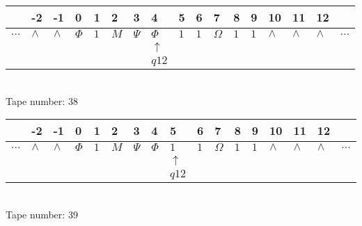 \documentclass{article}
\begin{document}
\begin{table}[H]
\centering
\begin{tabular}{lllllllllllllllll}
 & -2 & -1 & 0 & 1 & 2 & 3 & 4 & 5 & 6 & 7 & 8 & 9 & 10 & 11 & 12 & \\
\hline
$...$ & \multicolumn{1}{|l|}{$\wedge$} & \multicolumn{1}{|l|}{$\wedge$} & \multicolumn{1}{|l|}{$\Phi$} & \multicolumn{1}{|l|}{$1$} & \multicolumn{1}{|l|}{$M$} & \multicolumn{1}{|l|}{$\Psi$} & \multicolumn{1}{|l|}{$\Phi$} & \multicolumn{1}{|l|}{$1$} & \multicolumn{1}{|l|}{$1$} & \multicolumn{1}{|l|}{$\Omega$} & \multicolumn{1}{|l|}{$1$} & \multicolumn{1}{|l|}{$1$} & \multicolumn{1}{|l|}{$\wedge$} & \multicolumn{1}{|l|}{$\wedge$} & \multicolumn{1}{|l|}{$\wedge$} & $...$\\
\hline
&  &  &  &  &  &  & $\uparrow$ &  &  &  &  &  &  &  &  &  \\
&  &  &  &  &  &  & $ q12 $ &  &  &  &  &  &  &  &  &  \\
\end{tabular}
\\
Tape number: 38
\noindent\makebox[\linewidth]{\hdashrule{\textwidth}{1pt}{1pt}}\end{table}

\begin{table}[H]
\centering
\begin{tabular}{lllllllllllllllll}
 & -2 & -1 & 0 & 1 & 2 & 3 & 4 & 5 & 6 & 7 & 8 & 9 & 10 & 11 & 12 & \\
\hline
$...$ & \multicolumn{1}{|l|}{$\wedge$} & \multicolumn{1}{|l|}{$\wedge$} & \multicolumn{1}{|l|}{$\Phi$} & \multicolumn{1}{|l|}{$1$} & \multicolumn{1}{|l|}{$M$} & \multicolumn{1}{|l|}{$\Psi$} & \multicolumn{1}{|l|}{$\Phi$} & \multicolumn{1}{|l|}{$1$} & \multicolumn{1}{|l|}{$1$} & \multicolumn{1}{|l|}{$\Omega$} & \multicolumn{1}{|l|}{$1$} & \multicolumn{1}{|l|}{$1$} & \multicolumn{1}{|l|}{$\wedge$} & \multicolumn{1}{|l|}{$\wedge$} & \multicolumn{1}{|l|}{$\wedge$} & $...$\\
\hline
&  &  &  &  &  &  &  & $\uparrow$ &  &  &  &  &  &  &  &  \\
&  &  &  &  &  &  &  & $ q12 $ &  &  &  &  &  &  &  &  \\
\end{tabular}
\\
Tape number: 39
\noindent\makebox[\linewidth]{\hdashrule{\textwidth}{1pt}{1pt}}\end{table}
\end{document}
